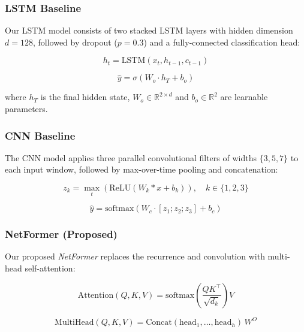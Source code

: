 \documentclass[conference]{IEEEtran}
\begin{document}
\subsubsection{LSTM Baseline}

Our LSTM model consists of two stacked LSTM layers with hidden
dimension $d = 128$, followed by dropout ($p = 0.3$) and a
fully-connected classification head:

\begin{equation}
	h_t = \text{LSTM}(x_t, h_{t-1}, c_{t-1})
\end{equation}

\begin{equation}
	\hat{y} = \sigma\!\left(W_o \cdot h_T + b_o\right)
\end{equation}

where $h_T$ is the final hidden state, $W_o \in \mathbb{R}^{2 \times d}$
and $b_o \in \mathbb{R}^{2}$ are learnable parameters.

\subsubsection{CNN Baseline}

The CNN model applies three parallel convolutional filters of widths
$\{3, 5, 7\}$ to each input window, followed by max-over-time pooling
and concatenation:

\begin{equation}
	z_k = \max_{t}\left(\text{ReLU}(W_k * x + b_k)\right), \quad
	k \in \{1,2,3\}
\end{equation}

\begin{equation}
	\hat{y} = \text{softmax}\!\left(W_c \cdot [z_1; z_2; z_3] + b_c\right)
\end{equation}

\subsubsection{NetFormer (Proposed)}

Our proposed \textit{NetFormer} replaces the recurrence and convolution
with multi-head self-attention:

\begin{equation}
	\text{Attention}(Q,K,V) =
	\text{softmax}\!\left(\frac{QK^\top}{\sqrt{d_k}}\right)V
\end{equation}

\begin{equation}
	\text{MultiHead}(Q,K,V) =
	\text{Concat}(\text{head}_1,\ldots,\text{head}_h)\,W^O
\end{equation}
\end{document}
